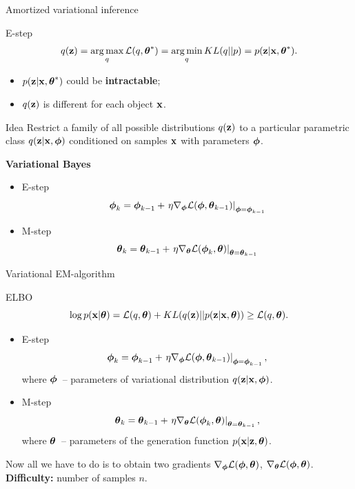 \begin{frame}{Amortized variational inference}
    \begin{block}{E-step}
    \vspace{-0.3cm}
    \[
		q(\mathbf{z}) = \operatorname*{arg\,max}_q \mathcal{L} (q, \boldsymbol{\theta}^*) = \operatorname*{arg\,min}_q KL(q || p) =
		 p(\mathbf{z}| \mathbf{x}, \boldsymbol{\theta}^*).
	\]
	\begin{itemize}
		\item $p(\mathbf{z}| \mathbf{x}, \boldsymbol{\theta}^*)$ could be \textbf{intractable};
		\item $q(\mathbf{z})$ is different for each object $\mathbf{x}$.
	\end{itemize}
    \end{block}
	\begin{block}{Idea}
	Restrict a family of all possible distributions $q(\mathbf{z})$ to a particular parametric class $q(\mathbf{z}|\mathbf{x}, \boldsymbol{\phi})$ conditioned on samples $\mathbf{x}$ with parameters $\boldsymbol{\phi}$.
	\end{block}
	
	\textbf{Variational Bayes}
	\begin{itemize}
		\item E-step
		\[
		\boldsymbol{\phi}_k = \boldsymbol{\phi}_{k-1} + \left.\eta \nabla_{\boldsymbol{\phi}} \mathcal{L}(\boldsymbol{\phi}, \boldsymbol{\theta}_{k-1})\right|_{\boldsymbol{\phi}=\boldsymbol{\phi}_{k-1}}
		\]
		\item M-step
		\[
		\boldsymbol{\theta}_k = \boldsymbol{\theta}_{k-1} + \left.\eta \nabla_{\boldsymbol{\theta}} \mathcal{L}(\boldsymbol{\phi}_k, \boldsymbol{\theta})\right|_{\boldsymbol{\theta}=\boldsymbol{\theta}_{k-1}}
		\]
	\end{itemize}
\end{frame}%
\begin{frame}{Variational EM-algorithm}

	\begin{block}{ELBO}
		\vspace{-0.1cm}
		\[
		\log p(\mathbf{x}| \boldsymbol{\theta}) = \mathcal{L} (q, \boldsymbol{\theta}) + KL(q(\mathbf{z}) || p(\mathbf{z}|\mathbf{x}, \boldsymbol{\theta})) \geq \mathcal{L} (q, \boldsymbol{\theta}).
		\]
	\end{block}
	\begin{itemize}
		\item E-step
		\[
		\boldsymbol{\phi}_k = \boldsymbol{\phi}_{k-1} + \left.\eta \nabla_{\boldsymbol{\phi}} \mathcal{L}(\boldsymbol{\phi}, \boldsymbol{\theta}_{k-1})\right|_{\boldsymbol{\phi}=\boldsymbol{\phi}_{k-1}},
		\]
		where $\boldsymbol{\phi}$~-- parameters of variational distribution $q(\mathbf{z} | \mathbf{x}, \boldsymbol{\phi})$.
		\item M-step
		\[
		\boldsymbol{\theta}_k = \boldsymbol{\theta}_{k-1} + \left.\eta \nabla_{\boldsymbol{\theta}} \mathcal{L}(\boldsymbol{\phi}_k, \boldsymbol{\theta})\right|_{\boldsymbol{\theta}=\boldsymbol{\theta}_{k-1}},
		\]
		where $\boldsymbol{\theta}$~-- parameters of the generation function $p(\mathbf{x} | \mathbf{z}, \boldsymbol{\theta})$.
	\end{itemize}
	Now all we have to do is to obtain two gradients $\nabla_{\boldsymbol{\phi}} \mathcal{L}(\boldsymbol{\phi}, \boldsymbol{\theta})$, $\nabla_{\boldsymbol{\theta}} \mathcal{L}(\boldsymbol{\phi}, \boldsymbol{\theta})$.  \\
	\textbf{Difficulty:} number of samples $n$.
\end{frame}
